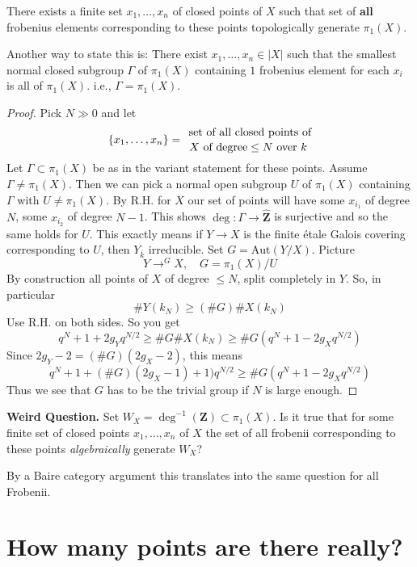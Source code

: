 \begin{proposition}
\label{proposition-finite-set-frobenii-generate-topologically}
There exists a finite set $x_1, \ldots, x_n$ of closed points of $X$
such that set of {\bf all} frobenius elements corresponding to these
points topologically generate $\pi_1(X)$.
\end{proposition}

\noindent
Another way to state this is:
There exist $x_1, \ldots, x_n\in |X|$ such that
the smallest normal closed subgroup $\Gamma$ of $\pi_1(X)$
containing $1$ frobenius element for each $x_i$ is all of $\pi_1(X)$. i.e.,
$\Gamma = \pi_1(X)$.

\begin{proof}
Pick $N\gg 0$ and let
$$
\{x_1, \ldots, x_n\} =
{\text{ set of all closed points of}
\atop X \text{ of degree} \leq N\text{ over } k}
$$
Let $\Gamma\subset \pi_1(X)$ be as in the variant statement for these
points. Assume $\Gamma \neq \pi_1(X)$. Then we can pick a normal open
subgroup $U$ of $\pi_1(X)$ containing $\Gamma$ with
$U \neq \pi_1(X)$. By R.H. for $X$ our set of points will have some
$x_{i_1}$ of degree $N$, some $x_{i_2}$ of degree $N - 1$. This shows
$\deg : \Gamma \to \widehat{\mathbf{Z}}$ is surjective
and so the same holds for $U$. This exactly
means if $Y \to X$ is the finite \'etale Galois covering
corresponding to $U$, then $Y_{\overline{k}}$ irreducible.
Set $G = \text{Aut}(Y/X)$. Picture
$$
Y \to^G X,\quad G = \pi_1(X)/U
$$
By construction all points of $X$ of degree $\leq N$, split
completely in $Y$. So, in particular
$$
\# Y(k_N)\geq (\# G)\# X(k_N)
$$
Use R.H. on both sides. So you get
$$
q^N+1+2g_Yq^{N/2}\geq \# G\# X(k_N)\geq \#
G(q^N+1-2g_Xq^{N/2})
$$
Since $2g_Y-2 = (\# G)(2g_X-2)$, this means
$$
q^N + 1 + (\# G)(2g_X - 1) + 1)q^{N/2}\geq
\# G (q^N + 1 - 2g_Xq^{N/2})
$$
Thus we see that $G$ has to be the trivial group if $N$ is large enough.
\end{proof}

\noindent
{\bf Weird Question.}
Set $W_X = \deg^{-1}(\mathbf{Z})\subset \pi_1(X)$.
Is it true that for some finite set of closed points $x_1, \ldots, x_n$ of $X$
the set of all frobenii corresponding to these points
{\it algebraically} generate $W_X$?

\medskip\noindent
By a Baire category argument this translates into the same question
for all Frobenii.





\section{How many points are there really?}
\label{section-really}

